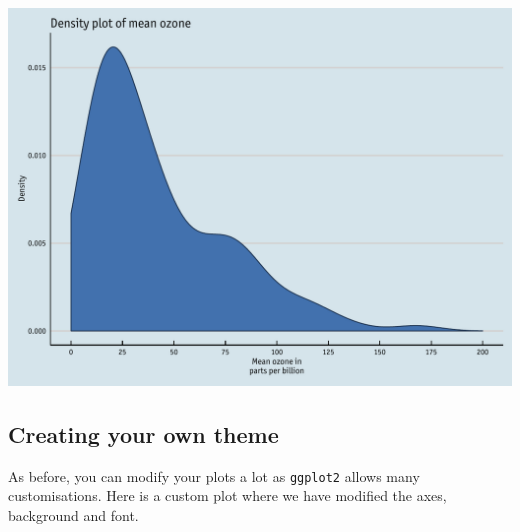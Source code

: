 \documentclass[]{article}
\begin{document}
\begin{center}\includegraphics{0_all_posts_pdf/density_11-1} \end{center}

\subsection{Creating your own theme}\label{creating-your-own-theme-7}

As before, you can modify your plots a lot as \texttt{ggplot2} allows
many customisations. Here is a custom plot where we have modified the
axes, background and font.
\end{document}
